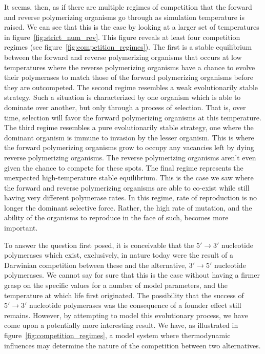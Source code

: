 It seems, then, as if there are multiple regimes of competition that the forward and reverse polymerizing organisms go through as simulation temperature is raised. We can see that this is the case by looking at a larger set of temperatures in figure~\ref{fig:strict_num_rev}. This figure reveals at least four competition regimes (see figure~\ref{fig:competition_regimes}). The first is a stable equilibrium between the forward and reverse polymerizing organisms that occurs at low temperatures where the reverse polymerizing organisms have a chance to evolve their polymerases to match those of the forward polymerizing organisms before they are outcompeted. The second regime resembles a weak evolutionarily stable strategy. Such a situation is characterized by one organism which is able to dominate over another, but only through a process of selection. That is, over time, selection will favor the forward polymerizing organisms at this temperature. The third regime resembles a pure evolutionarily stable strategy, one where the dominant organism is immune to invasion by the lesser organism. This is where the forward polymerizing organisms grow to occupy any vacancies left by dying reverse polymerizing organisms. The reverse polymerizing organisms aren't even given the chance to compete for these spots. The final regime represents the unexpected high-temperature stable equilibrium. This is the case we saw where the forward and reverse polymerizing organisms are able to co-exist while still having very different polymerase rates. In this regime, rate of reproduction is no longer the dominant selective force. Rather, the high rate of mutation, and the ability of the organisms to reproduce in the face of such, becomes more important.

To answer the question first posed, it is conceivable that the $5'\to3'$ nucleotide polymerases which exist, exclusively, in nature today were the result of a Darwinian competition between these and the alternative, $3'\to5'$ nucleotide polymerases. We cannot say for sure that this is the case without having a firmer grasp on the specific values for a number of model parameters, and the temperature at which life first originated. The possibility that the success of $5'\to3'$ nucleotide polymerases was the consequence of a founder effect still remains. However, by attempting to model this evolutionary process, we have come upon a potentially more interesting result. We have, as illustrated in figure~\ref{fig:competition_regimes}, a model system where thermodynamic influences may determine the nature of the competition between two alternatives.
